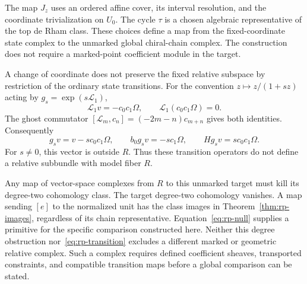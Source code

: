 The map $J_z$ uses an ordered affine cover, its interval resolution, and the coordinate trivialization on $U_0$.
The cycle $\tau$ is a chosen algebraic representative of the top de Rham class.
These choices define a map from the fixed-coordinate state complex to the unmarked global chiral-chain complex.
The construction does not require a marked-point coefficient module in the target.

A change of coordinate does not preserve the fixed relative subspace by restriction of the ordinary state transitions.
For the convention $z\mapsto z/(1+sz)$ acting by $g_s=\exp(s\mathcal L_1)$,
\[
 \mathcal L_1v=-c_0c_1\Omega,\qquad
 \mathcal L_1(c_0c_1\Omega)=0.
\]
The ghost commutator $[\mathcal L_m,c_n]=(-2m-n)c_{m+n}$ gives both identities.
Consequently
\begin{equation}\label{eq:rp-transition}
 g_sv=v-sc_0c_1\Omega,\qquad
 b_0g_sv=-sc_1\Omega,\qquad Hg_sv=sc_0c_1\Omega.
\end{equation}
For $s\ne0$, this vector is outside $R$.
Thus these transition operators do not define a relative subbundle with model fiber $R$.

Any map of vector-space complexes from $R$ to this unmarked target must kill its degree-two cohomology class.
The target degree-two cohomology vanishes.
A map sending $[e]$ to the normalized unit has the class images in Theorem~\ref{thm:rp-images}, regardless of its chain representative.
Equation~\eqref{eq:rp-null} supplies a primitive for the specific comparison constructed here.
Neither this degree obstruction nor~\eqref{eq:rp-transition} excludes a different marked or geometric relative complex.
Such a complex requires defined coefficient sheaves, transported constraints, and compatible transition maps before a global comparison can be stated.
